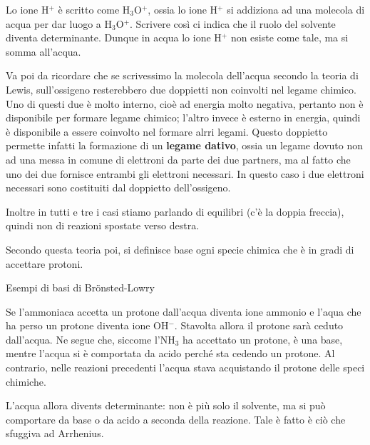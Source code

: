 \vspace{0.2cm}Lo ione H$^+$ è scritto come H$_3$O$^+$, ossia lo ione H$^+$ si addiziona ad una molecola di acqua per dar luogo a H$_3$O$^+$. Scrivere così ci indica che il ruolo del solvente diventa determinante. Dunque in acqua lo ione H$^+$ non esiste come tale, ma si somma all'acqua.

Va poi da ricordare che se scrivessimo la molecola dell'acqua secondo la teoria di Lewis, sull'ossigeno resterebbero due doppietti non coinvolti nel legame chimico. Uno di questi due è molto interno, cioè ad energia molto negativa, pertanto non è disponibile per formare legame chimico; l'altro invece è esterno in energia, quindi è disponibile a essere coinvolto nel formare alrri legami. Questo doppietto permette infatti la formazione di un \textbf{legame dativo}, ossia un legame dovuto non ad una messa in comune di elettroni da parte dei due partners, ma al fatto che uno dei due fornisce entrambi gli elettroni necessari. In questo caso i due elettroni necessari sono costituiti dal doppietto dell'ossigeno.

Inoltre in tutti e tre i casi stiamo parlando di equilibri (c'è la doppia freccia), quindi non di reazioni spostate verso destra.

\vspace{0.2cm}Secondo questa teoria poi, si definisce base ogni specie chimica che è in gradi di accettare protoni.

\vspace{0.2cm}Esempi di basi di Brönsted-Lowry

\vspace{0.2cm}

\vspace{0.2cm}Se l'ammoniaca accetta un protone dall'acqua diventa ione ammonio e l'aqua che ha perso un protone diventa ione OH$^-$. Stavolta allora il protone sarà ceduto dall'acqua. Ne segue che, siccome l'NH$_3$ ha accettato un protone, è una base, mentre l'acqua si è comportata da acido perché sta cedendo un protone. Al contrario, nelle reazioni precedenti l'acqua stava acquistando il protone delle speci chimiche.

L'acqua allora divents determinante: non è più solo il solvente, ma si può comportare da base o da acido a seconda della reazione. Tale è fatto è ciò che sfuggiva ad Arrhenius.

\vspace{0.2cm}

